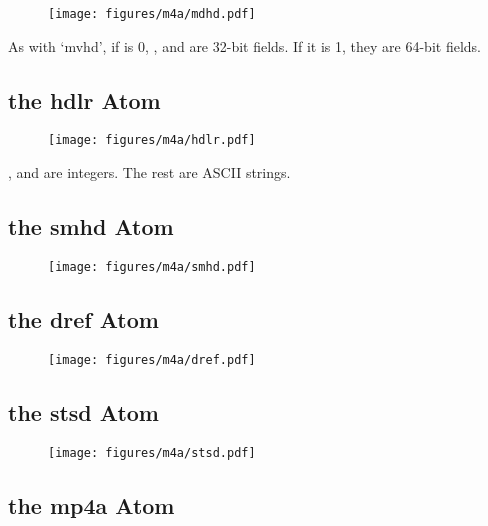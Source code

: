 \begin{figure}[h]
\texttt{[image: figures/m4a/mdhd.pdf]}
\end{figure}
\par
\noindent
As with `mvhd', if  is 0, ,
 and  are 32-bit fields.
If it is 1, they are 64-bit fields.

\clearpage

\subsection{the hdlr Atom}

\begin{figure}[h]
\texttt{[image: figures/m4a/hdlr.pdf]}
\end{figure}
\par
\noindent
{},  and 
are integers.  The rest are ASCII strings.

\subsection{the smhd Atom}

\begin{figure}[h]
\texttt{[image: figures/m4a/smhd.pdf]}
\end{figure}

\subsection{the dref Atom}

\begin{figure}[h]
\texttt{[image: figures/m4a/dref.pdf]}
\end{figure}

\clearpage

\subsection{the stsd Atom}

\begin{figure}[h]
\texttt{[image: figures/m4a/stsd.pdf]}
\end{figure}

\subsection{the mp4a Atom}

